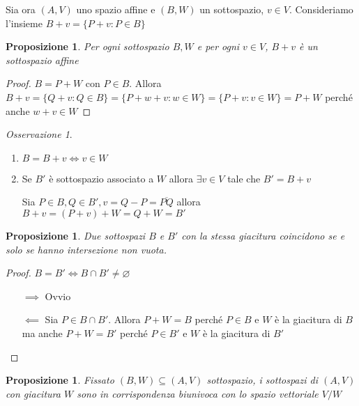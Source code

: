 \documentclass{article}
\newcommand{\incfig}[2][1]{%
    \def\svgwidth{#1\columnwidth}
    {#2.pdf_tex}
}
\newcounter{theo}[section]\setcounter{theo}{0}
\theoremstyle{plain}
\newtheorem{proposition}[theo]{Proposizione}
\theoremstyle{definition}
\theoremstyle{remark}
\newtheorem*{remark}{Osservazione}
\begin{document}
Sia ora \((A, V)\) uno spazio affine e \((B, W)\) un sottospazio, \(v \in V\).
Consideriamo l'insieme \(B + v = \{P + v : P \in  B\} \) 

\begin{proposition}
    Per ogni sottospazio \(B, W\) e per ogni \(v \in  V\), \(B + v\) è un
    sottospazio affine
\end{proposition}
\begin{proof}
    \(B = P + W\) con \(P \in B\). Allora \(B + v = \{Q + v : Q \in  B\} = \{P +
    w + v : w \in W \}  = \{P + v : v \in  W\}  = P + W\) perché anche \(w + v \in W\) 
\end{proof}

\begin{remark}
\begin{enumerate}[label = \arabic*)]
    \item \(B = B + v \iff v \in W\) 
    \item Se \(B'\)  è sottospazio associato a \(W\) allora \(\exists v \in  V\) tale
        che \(B' = B + v\) 

        Sia \(P \in B, Q \in B', v = Q - P = \overline{PQ}\) allora \(B + v = (P
        + v) + W = Q + W = B'\) 
\end{enumerate}
\end{remark}

\begin{proposition}
    Due sottospazi \(B\)  e \(B'\) con la stessa giacitura coincidono se e solo
    se hanno intersezione non vuota.
\end{proposition}
\begin{proof}
    \(B = B' \iff B \cap  B' \neq \varnothing\) 
\begin{itemize}[label = --]
    \item[\(\implies \) ] Ovvio
    \item[\(\impliedby \) ] Sia \(P \in  B \cap B'\). Allora \(P + W = B\)
        perché \(P \in  B\) e \(W\) è la giacitura di \(B\) ma anche \(P+W =
        B'\) perché \(P \in B'\) e \(W\) è la giacitura di \(B'\) 
\end{itemize}
\end{proof}

\begin{proposition}
    Fissato \((B, W) \subseteq (A, V) \) sottospazio, i sottospazi di \((A, V)\)
    con giacitura \(W\) sono in corrispondenza biunivoca con lo spazio
    vettoriale \(V / W\) 
\end{proposition}
\end{document}
